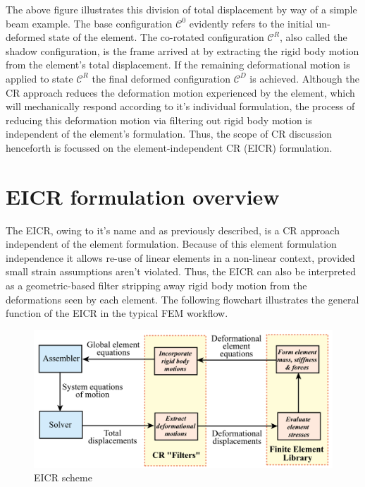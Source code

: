 The above figure illustrates this division of total displacement by way of a simple beam example. The base configuration $\mathscr{C}^0$ evidently refers to the initial un-deformed state of the element. The co-rotated configuration $\mathscr{C}^R$, also called the shadow configuration, is the frame arrived at by extracting the rigid body motion from the element's total displacement. If the remaining deformational motion is applied to state $\mathscr{C}^R$ the final deformed configuration $\mathscr{C}^D$ is achieved. Although the CR approach reduces the deformation motion experienced by the element, which will mechanically respond according to it's individual formulation, the process of reducing this deformation motion via filtering out rigid body motion is independent of the element's formulation. Thus, the scope of CR discussion henceforth is focussed on the element-independent CR (EICR) formulation.

\section{EICR formulation overview}
\label{EICR overview}
The EICR, owing to it's name and as previously described, is a CR approach independent of the element formulation. Because of this element formulation independence it allows re-use of linear elements in a non-linear context, provided small strain assumptions aren't violated. Thus, the EICR can also be interpreted as a geometric-based filter stripping away rigid body motion from the deformations seen by each element. The following flowchart illustrates the general function of the EICR in the typical FEM workflow.

\begin{figure}[H]
	\centering
	\def\svgwidth{\columnwidth}
	\includegraphics[width=14cm]{images/cr_3.png}
	\caption{EICR scheme \cite{FelippaCR1_2016}}
	\label{cr3}
\end{figure}

